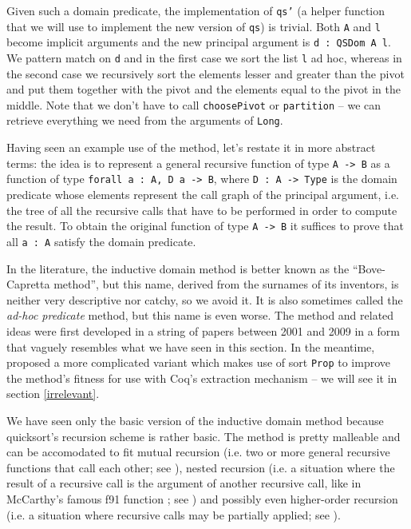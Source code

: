 \documentclass[declaration,mgr,english,shortabstract]{iithesis}
\newcommand{\m}[1]{\texttt{#1}}
\begin{document}
Given such a domain predicate, the implementation of \m{qs'} (a helper function that we will use to implement the new version of \m{qs}) is trivial. Both \m{A} and \m{l} become implicit arguments and the new principal argument is \m{d\ :\ QSDom A l}. We pattern match on \m{d} and in the first case we sort the list \m{l} ad hoc, whereas in the second case we recursively sort the elements lesser and greater than the pivot and put them together with the pivot and the elements equal to the pivot in the middle. Note that we don't have to call \m{choosePivot} or \m{partition} -- we can retrieve everything we need from the arguments of \m{Long}.

Having seen an example use of the method, let's restate it in more abstract terms: the idea is to represent a general recursive function of type \m{A -> B} as a function of type \m{forall a\ :\ A, D a -> B}, where \m{D\ :\ A -> Type} is the domain predicate whose elements represent the call graph of the principal argument, i.e. the tree of all the recursive calls that have to be performed in order to compute the result. To obtain the original function of type \m{A -> B} it suffices to prove that all \m{a\ :\ A} satisfy the domain predicate.

In the literature, the inductive domain method is better known as the ``Bove-Capretta method'', but this name, derived from the surnames of its inventors, is neither very descriptive nor catchy, so we avoid it. It is also sometimes called the \textit{ad-hoc predicate} method, but this name is even worse. The method and related ideas were first developed in a string of papers between 2001 and 2009 \cite{BCM1} \cite{BCM2} \cite{BCM3} \cite{BCM4} \cite{BCM5} \cite{BCM6} \cite{BCM7} \cite{BCM8} \cite{BCM9} in a form that vaguely resembles what we have seen in this section. In the meantime, \cite{CoqArt} proposed a more complicated variant which makes use of sort \m{Prop} to improve the method's fitness for use with Coq's extraction mechanism -- we will see it in section \ref{irrelevant}.

We have seen only the basic version of the inductive domain method because quicksort's recursion scheme is rather basic. The method is pretty malleable and can be accomodated to fit mutual recursion (i.e. two or more general recursive functions that call each other; see \cite{BCM3}), nested recursion (i.e. a situation where the result of a recursive call is the argument of another recursive call, like in McCarthy's famous f91 function \cite{f91}; see \cite{BCM2}) and possibly even higher-order recursion (i.e. a situation where recursive calls may be partially applied; see \cite{BCM6}).
\end{document}
